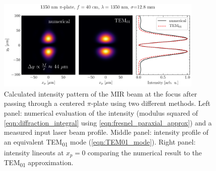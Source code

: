 \begin{figure}
	\centering
	\includegraphics[width=0.9\textwidth]{figures/chap1/pi_plate_focus_LP_TEM_1350nm.pdf}
	\caption{Calculated intensity pattern of the MIR beam at the focus after passing through a centered $\pi$-plate using two different methods. Left panel: numerical evaluation of the intensity (modulus squared of \cref{eqn:diffraction_integral} using \cref{eqn:fresnel_paraxial_approx}) and a measured input laser beam profile. Middle panel: intensity profile of an equivalent TEM\textsubscript{01} mode (\cref{eqn:TEM01_mode}). Right panel: intensity lineouts at $x_p = 0$ comparing the numerical result to the TEM\textsubscript{01} approximation.}
	\label{fig:pi_plate_focus_sim}
\end{figure}

